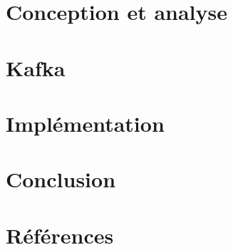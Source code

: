 \documentclass[a4paper, 10pt]{article}
\begin{document}
\section{Conception et analyse} %

\newpage

\section{Kafka} %

\newpage

\section{Implémentation} %

\newpage

\section{Conclusion} %

\newpage

\section{Références} %


\end{document}
